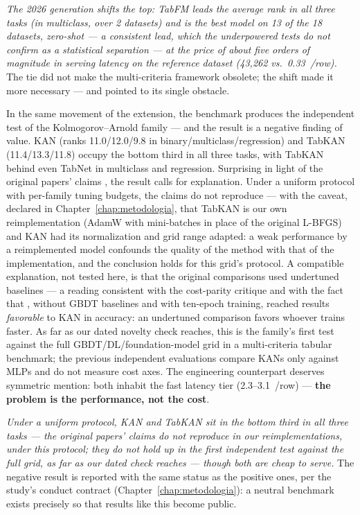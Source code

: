\emph{The 2026 generation shifts the top: TabFM leads the average
rank in all three tasks (in multiclass, over 2 datasets) and is the
best model on 13 of the 18 datasets, zero-shot --- a consistent lead,
which the underpowered tests do not confirm as a statistical
separation --- at the price of about five orders of magnitude in
serving latency on the reference dataset (43{,}262 vs.\
0.33~\us/row).} The tie did not make
the multi-criteria framework obsolete; the shift made it more
necessary --- and pointed to its single obstacle.

In the same movement of the extension, the benchmark produces the
independent test of the Kolmogorov--Arnold family --- and the result
is a negative finding of value. KAN (ranks 11.0/12.0/9.8 in
binary/multiclass/regression) and TabKAN (11.4/13.3/11.8) occupy the
bottom third in all three tasks, with TabKAN behind even TabNet in
multiclass and regression. Surprising in light of the original
papers' claims \citep{kan2024,tabkan2025}, the result calls for
explanation. Under a uniform protocol with per-family tuning budgets,
the claims do not reproduce --- with the caveat, declared in
Chapter~\ref{chap:metodologia}, that TabKAN is our own
reimplementation (AdamW with mini-batches in place of the original
L-BFGS) and KAN had its normalization and grid range adapted: a weak
performance by a reimplemented model confounds the quality of the
method with that of the implementation, and the conclusion holds for
this grid's protocol. A compatible explanation, not tested here, is
that the original comparisons used undertuned baselines --- a reading
consistent with the cost-parity critique \citep{kancritical2024} and
with the fact that \citet{poeta2024}, without GBDT baselines and with
ten-epoch training, reached results \emph{favorable} to KAN in
accuracy: an undertuned comparison favors whoever trains faster. As
far as our dated novelty check reaches, this is the family's first
test against the full GBDT/DL/foundation-model grid in a
multi-criteria tabular benchmark; the previous independent
evaluations \citep{poeta2024,kancritical2024} compare KANs only
against MLPs and do not measure cost axes. The engineering
counterpart deserves symmetric mention: both inhabit the fast latency
tier (2.3--3.1~\us/row) --- \textbf{the problem is the performance,
not the cost}.

\emph{Under a uniform protocol, KAN and TabKAN sit in the bottom
third in all three tasks --- the original papers' claims do not
reproduce in our reimplementations, under this protocol; they do not hold
up in the first independent test against the full grid, as far as our
dated check reaches --- though both are cheap to serve.} The negative
result is reported with the same status as the positive ones, per the
study's conduct contract (Chapter~\ref{chap:metodologia}): a neutral
benchmark exists precisely so that results like this become public.

